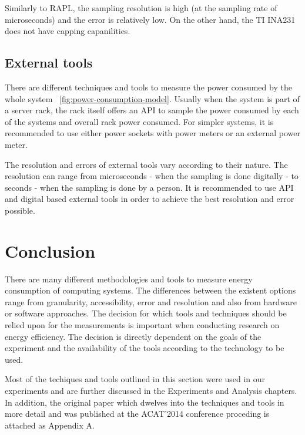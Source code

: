 Similarly to RAPL, the sampling resolution is high (at the sampling rate of microseconds) and the error is relatively low. On the other hand, the TI INA231 does not have capping capanilities.


\subsection{External tools}

There are different techniques and tools to measure the power consumed by the whole system ~\ref{fig:power-consumption-model}. Usually when the system is part of a server rack, the rack itself offers an API to sample the power consumed by each of the systems and overall rack power consumed. For simpler systems, it is recommended to use either power sockets with power meters or an external power meter. 

The resolution and errors of external tools vary according to their nature. The resolution can range from microseconds - when the sampling is done digitally - to seconds - when the sampling is done by a person. It is recommended to use API and digital based external tools in order to achieve the best resolution and error possible. 



\section*{Conclusion}
There are many different methodologies and tools to measure energy consumption of computing systems. The differences between the existent options range from granularity, accessibility, error and resolution and also from hardware or software approaches. The decision for which tools and techniques should be relied upon for the measurements is important when conducting research on energy efficiency. The decision is directly dependent on the goals of the experiment and the availability of the tools according to the technology to be used. 

Most of the techiques and tools outlined in this section were used in our experiments and are further discussed in the Experiments and Analysis chapters. In addition, the original paper which dwelves into the techniques and tools in more detail and was published at the ACAT'2014 conference proceding is attached as Appendix A.